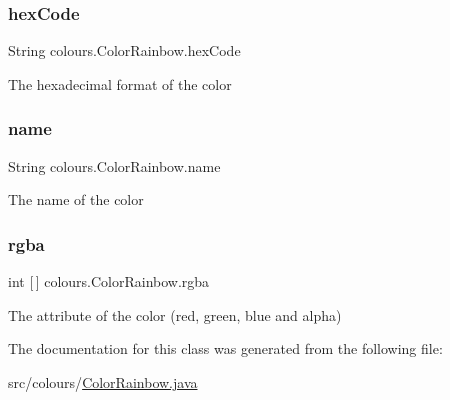 \subsubsection{\texorpdfstring{hex\+Code}{hexCode}}
{\footnotesize\ttfamily String colours.\+Color\+Rainbow.\+hex\+Code\hspace{0.3cm}{\ttfamily [private]}}

The hexadecimal format of the color \mbox{\label{classcolours_1_1_color_rainbow_a829067e626095a0cb25ef7f708ddccb3}} 
\subsubsection{\texorpdfstring{name}{name}}
{\footnotesize\ttfamily String colours.\+Color\+Rainbow.\+name\hspace{0.3cm}{\ttfamily [private]}}

The name of the color \mbox{\label{classcolours_1_1_color_rainbow_aea1f40a66bcc34656e109edcc9cf86dd}} 
\subsubsection{\texorpdfstring{rgba}{rgba}}
{\footnotesize\ttfamily int \mbox{[}$\,$\mbox{]} colours.\+Color\+Rainbow.\+rgba\hspace{0.3cm}{\ttfamily [private]}}

The attribute of the color (red, green, blue and alpha) 

The documentation for this class was generated from the following file\+:\begin{DoxyCompactItemize}
\item 
src/colours/\hyperlink{_color_rainbow_8java}{Color\+Rainbow.\+java}\end{DoxyCompactItemize}
